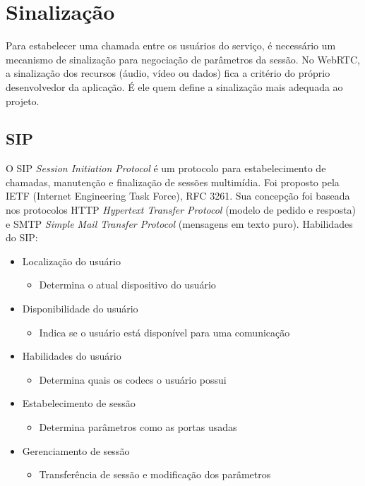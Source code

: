 \documentclass[12pt,a4paper,oneside]{report}
\begin{document}
\section{Sinalização}
\label{s_sinalizacao}
Para estabelecer uma chamada entre os usuários do serviço, é necessário um mecanismo de sinalização para negociação de parâmetros da sessão. No WebRTC, a sinalização dos recursos (áudio, vídeo ou dados) fica a critério do próprio desenvolvedor da aplicação. É ele quem define a sinalização mais adequada ao projeto.

\subsection{SIP}
\label{ss_sip}
O SIP \textit{Session Initiation Protocol} é um protocolo para estabelecimento de chamadas, manutenção e finalização de sessões multimídia. Foi proposto pela IETF (Internet Engineering Task Force), RFC 3261.
Sua concepção foi baseada nos protocolos HTTP \textit{Hypertext Transfer Protocol} (modelo de pedido e resposta) e SMTP \textit{Simple Mail Transfer Protocol} (mensagens em texto puro). \cite{MELLO}
Habilidades do SIP:
\begin{itemize}
 \item Localização do usuário
    \begin{itemize}
    \item  Determina o atual dispositivo do usuário
    \end{itemize}
 \item Disponibilidade do usuário
    \begin{itemize}
	 \item  Indica se o usuário está disponível para uma comunicação
    \end{itemize}
 \item Habilidades do usuário
    \begin{itemize}
	 \item  Determina quais os codecs o usuário possui
    \end{itemize}
 \item Estabelecimento de sessão
    \begin{itemize}
	 \item  Determina parâmetros como as portas usadas
    \end{itemize}
 \item Gerenciamento de sessão
    \begin{itemize}
	 \item  Transferência de sessão e modificação dos parâmetros
    \end{itemize}
\end{itemize}
\end{document}
